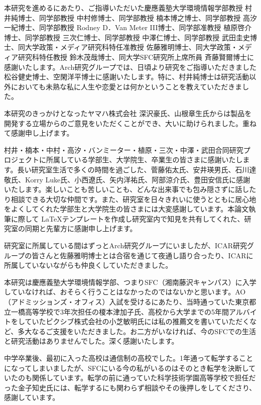 \begin{acknowledgment}

  本研究を進めるにあたり、ご指導いただいた慶應義塾大学環境情報学部教授 村井純博士、同学部教授 中村修博士、同学部教授 楠本博之博士、同学部教授 高汐一紀博士、同学部教授 Rodney D．Van Meter III博士、同学部准教授 植原啓介博士、同学部教授 三次仁博士、同学部教授 中澤仁博士、同学部教授 武田圭史博士、同大学政策・メディア研究科特任准教授 佐藤雅明博士、同大学政策・メディア研究科特任教授 鈴木茂哉博士、同大学SFC研究所上席所員 斉藤賢爾博士に感謝いたします。Arch研究グループでは、日頃より研究をご指導いただきました松谷健史博士、空閑洋平博士に感謝いたします。特に、村井純博士は研究活動以外においても未熟な私に人生や恋愛とは何かということを教えていただきました。

  本研究のきっかけとなったヤマハ株式会社 深沢豪氏、山根章生氏からは製品を開発する立場からのご意見をいただくことができ、大いに助けられました。重ねて感謝申し上げます。

  村井・楠本・中村・高汐・バンミーター・植原・三次・中澤・武田合同研究プロジェクトに所属している学部生、大学院生、卒業生の皆さまに感謝いたします。長い研究室生活で多くの時間を過ごした、菅藤佑太氏、安井瑛男氏、石川達敬氏、Korry Luke氏、小西遼氏、矢内洋祐氏、阿部涼介氏、豊田安信氏に感謝いたします。楽しいことも苦しいことも、どんな出来事でも包み隠さずに話したり相談できる大切な仲間です。また、研究室を日々きれいに使うとともに居心地をよくしてくれた学部生と大学院生の皆さまには大変感謝しています。本論文執筆に際して \LaTeX テンプレートを作成し研究室内で知見を共有してくれた、研究室の同期と先輩方に感謝申し上げます。

  研究室に所属している間はずっとArch研究グループにいましたが、ICAR研究グループの皆さんと佐藤雅明博士とは合宿を通じて夜通し語り合ったり、ICARに所属していないながらも仲良くしていただきました。

  本研究は慶應義塾大学環境情報学部、つまりSFC（湘南藤沢キャンパス）に入学していなければ、おそらく行うことはなかったのではないかと思います。AO（アドミッションズ・オフィス）入試を受けるにあたり、当時通っていた東京都立一橋高等学校で3年次担任の榎本津加子氏、高校から大学までの5年間アルバイトをしていたピクシブ株式会社の小芝敏明氏には私の推薦文を書いていただくなど、多大なるご支援をいただきました。お二方がいなければ、今のSFCでの生活と研究活動はありませんでした。深く感謝いたします。

  中学卒業後、最初に入った高校は通信制の高校でした。1年通って転学することになってしまいましたが、SFCにいる今の私がいるのはそのとき転学を決断していたのも関係しています。転学の前に通っていた科学技術学園高等学校で担任だった金子知史氏には、転学するにも関わらず相談やその後押しをしてくださり、感謝しています。


\end{acknowledgment}
